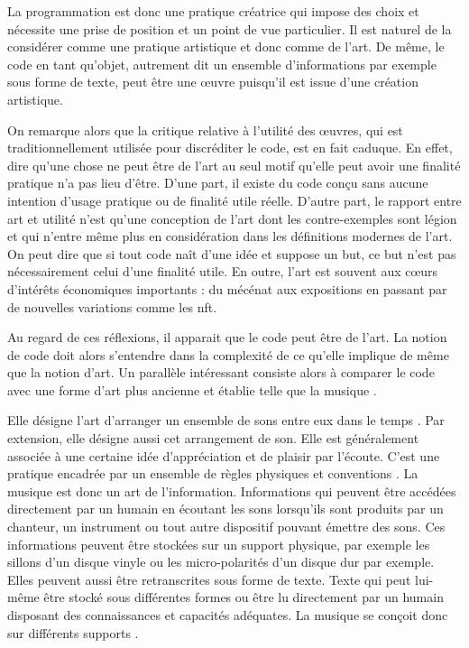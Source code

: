 \documentclass[12pt]{article} %
\begin{document}
La programmation est donc une pratique créatrice qui impose des choix et nécessite une prise de position et un point de vue particulier. Il est naturel de la considérer comme une pratique artistique et donc comme de l'art. De même, le code en tant qu'objet, autrement dit un ensemble d'informations par exemple sous forme de texte, peut être une œuvre puisqu'il est issue d'une création artistique.

On remarque alors que la critique relative à l'utilité des œuvres, qui est traditionnellement utilisée pour discréditer le code, est en fait caduque. En effet, dire qu'une chose ne peut être de l'art au seul motif qu'elle peut avoir une finalité pratique n'a pas lieu d'être. D'une part, il existe du code conçu sans aucune intention d'usage pratique ou de finalité utile réelle. D'autre part, le rapport entre art et utilité n'est qu'une conception de l'art dont les contre-exemples sont légion et qui n'entre même plus en considération dans les définitions modernes de l'art. On peut dire que si tout code naît d'une idée et suppose un but, ce but n'est pas nécessairement celui d'une finalité utile. En outre, l'art est souvent aux cœurs d'intérêts économiques importants : du mécénat aux expositions en passant par de nouvelles variations comme les \acrshort{nft}.

Au regard de ces réflexions, il apparait que le code peut être de l'art. La notion de code doit alors s'entendre dans la complexité de ce qu'elle implique de même que la notion d'art. Un parallèle intéressant consiste alors à comparer le code avec une forme d'art plus ancienne et établie telle que la musique \cite{Kivy1991-wt}.

Elle désigne l'art d'arranger un ensemble de sons entre eux dans le temps \cite{Wikipedia-music}. Par extension, elle désigne aussi cet arrangement de son. Elle est généralement associée à une certaine idée d'appréciation et de plaisir par l'écoute. C'est une pratique encadrée par un ensemble de règles physiques et conventions \cite{PDorrell2005}. La musique est donc un art de l'information. Informations qui peuvent être accédées directement par un humain en écoutant les sons lorsqu'ils sont produits par un chanteur, un instrument ou tout autre dispositif pouvant émettre des sons. Ces informations peuvent être stockées sur un support physique, par exemple les sillons d'un disque vinyle ou les micro-polarités d'un disque dur par exemple. Elles peuvent aussi être retranscrites sous forme de texte. Texte qui peut lui-même être stocké sous différentes formes ou être lu directement par un humain disposant des connaissances et capacités adéquates.  La musique se conçoit donc sur différents supports \cite{PDorrell2005}.
\end{document}
